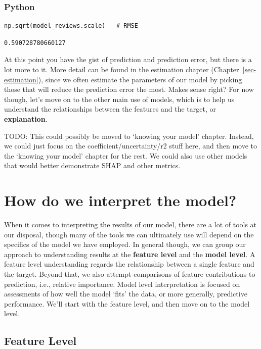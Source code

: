 \documentclass[
  letterpaper,
]{krantz}
\begin{document}
\subsubsection{Python}

\begin{verbatim}
np.sqrt(model_reviews.scale)   # RMSE
\end{verbatim}

\begin{verbatim}
0.590728780660127
\end{verbatim}

At this point you have the gist of prediction and prediction error, but
there is a lot more to it. More detail can be found in the estimation
chapter (Chapter~\ref{sec-estimation}), since we often estimate the
parameters of our model by picking those that will reduce the prediction
error the most. Makes sense right? For now though, let's move on to the
other main use of models, which is to help us understand the
relationships between the features and the target, or
\textbf{explanation}.

TODO: This could possibly be moved to `knowing your model' chapter.
Instead, we could just focus on the coefficient/uncertainty/r2 stuff
here, and then move to the `knowing your model' chapter for the rest. We
could also use other models that would better demonstrate SHAP and other
metrics.

\section{How do we interpret the model?}\label{sec-lm-interpretation}

When it comes to interpreting the results of our model, there are a lot
of tools at our disposal, though many of the tools we can ultimately use
will depend on the specifics of the model we have employed. In general
though, we can group our approach to understanding results at the
\textbf{feature level} and the \textbf{model level}. A feature level
understanding regards the relationship between a single feature and the
target. Beyond that, we also attempt comparisons of feature
contributions to prediction, i.e., relative importance. Model level
interpretation is focused on assessments of how well the model `fits'
the data, or more generally, predictive performance. We'll start with
the feature level, and then move on to the model level.

\subsection{Feature Level}\label{sec-lm-interpretation-feature}
\end{document}
